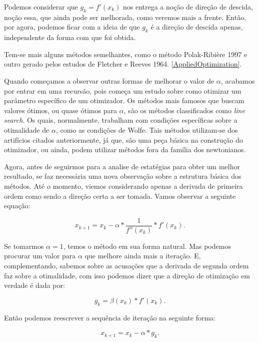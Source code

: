 Podemos considerar que \(g_k = f'(x_k) \) nos entrega a noção de direção de
descida, noção essa, que ainda pode ser melhorada, como veremos mais a frente.
Então, por agora, podemos ficar com a ideia de que \(g_k\) é a direção de
descida apenas, independente da forma com que foi obtida.

Tem-se mais alguns métodos semelhantes, como o método Polak-Ribière 1997 e
outro gerado pelos estudos de Fletcher e Reeves 1964. \ref{AppliedOptimization}.

Quando começamos a observar outras formas de melhorar o valor de \(\alpha\),
acabamos por entrar em uma recursão, pois começa um estudo sobre como
otimizar um parâmetro específico de um otimizador. Os métodos mais famosos que
buscam valores ótimos, ou quase ótimos para \(\alpha\), são os métodos
classificados como \textit{line search}. Os quais, normalmente, trabalham
com condições específicas sobre a otimalidade de \(\alpha\), como as condições
de Wolfe. Tais métodos utilizam-se dos artifícios citados
anteriormente, já que, são uma peça básica na construção do otimizador,
ou ainda, podem utilizar métodos fora da família dos newtonianos.

Agora, antes de seguirmos para a analise de estatégias para obter um melhor
resultado, se faz necessária uma nova observação sobre a estrutura básica
dos métodos. Até o momento, viemos considerando apenas a derivada de primeira
ordem como sendo a direção certa a ser tomada. Vamos observar a seguinte
equação:

\begin{equation}
    x_{k+1} = x_{k} - \alpha * \frac{1}{f''(x_k)} * f'(x_k).
\end{equation}

Se tomarmos \(\alpha = 1\), temos o método em sua forma natural. Mas
podemos procurar um valor para \(\alpha\) que melhore ainda mais a iteração.
E, complementando, sabemos sobre as acusações que a derivada de segunda ordem
faz sobre a otimalidade, com isso podemos dizer que a direção de otimização
em verdade é dada por:

\begin{equation}
    g_k = \beta(x_k) * f'(x_k).
\end{equation}

Então podemos reescrever a sequência de iteração na seguinte forma:

\begin{equation}
    x_{k+1} = x_{k} - \alpha * g_{k}.
\end{equation}


